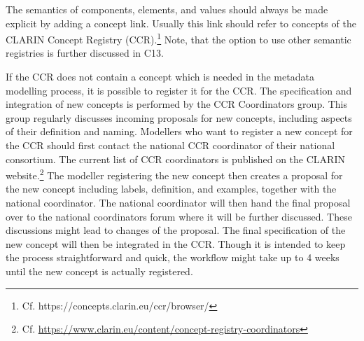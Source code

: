 \begin{workinprogress}
The semantics of components, elements, and values should always be made explicit by adding a concept link. Usually this link should refer to concepts of the CLARIN Concept Registry (CCR).\footnote{Cf. https://concepts.clarin.eu/ccr/browser/} Note, that the option to use other semantic registries is further discussed in C13.

If the CCR does not contain a concept which is needed in the metadata modelling process, it is possible to register it for the CCR. The specification and integration of new concepts is performed by the CCR Coordinators group. This group regularly discusses incoming proposals for new concepts, including aspects of their definition and naming. Modellers who want to register a new concept for the CCR should first contact the national CCR coordinator of their national consortium. The current list  of CCR coordinators is published on the CLARIN website.\footnote{Cf. \url{https://www.clarin.eu/content/concept-registry-coordinators}} The modeller registering the new concept then creates a proposal for the new concept including labels, definition, and examples, together with the national coordinator. The national coordinator will then hand the final proposal over to the national coordinators forum where it will be further discussed. These discussions might lead to changes of the proposal. The final specification of the new concept will then be integrated in the CCR. Though it is intended to keep the process straightforward and quick, the workflow might take up to 4 weeks until the new concept is actually registered.
\end{workinprogress}